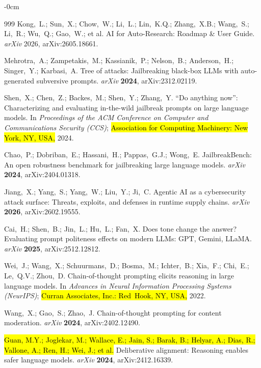 \documentclass[superintelligence,article,accept,moreauthors]{Definitions/mdpi}
\begin{document}
\begin{adjustwidth}{-\extralength}{0cm}
{\begin{thebibliography}{999}
Kong,~L.; Sun,~X.; Chow,~W.; Li,~L.; Lin,~K.Q.; Zhang,~X.B.; Wang,~S.; Li,~R.; Wu,~Q.; Gao,~W.; et al.
AI for Auto-Research: Roadmap \& User Guide.
{\em arXiv} 2026, arXiv:2605.18661.

Mehrotra,~A.; Zampetakis,~M.; Kassianik,~P.; Nelson,~B.; Anderson,~H.; Singer,~Y.; Karbasi,~A.
Tree of attacks: Jailbreaking black-box {LLMs} with auto-generated subversive prompts.
{\em arXiv} {\bf 2024}, arXiv:2312.02119.


Shen,~X.; Chen,~Z.; Backes,~M.; Shen,~Y.; Zhang,~Y.
``{D}o anything now'': Characterizing and evaluating in-the-wild jailbreak prompts on large language models.
In {\em Proceedings of the ACM Conference on Computer and Communications Security (CCS)}; \hl{Association for Computing Machinery: New York, NY, USA,} 2024.

Chao,~P.; Dobriban,~E.; Hassani,~H.; Pappas,~G.J.; Wong,~E.
{JailbreakBench}: An open robustness benchmark for jailbreaking large language models.
{\em arXiv} {\bf 2024}, arXiv:2404.01318.

Jiang,~X.; Yang,~S.; Yang,~W.; Liu,~Y.; Ji,~C.
Agentic {AI} as a cybersecurity attack surface: Threats, exploits, and defenses in runtime supply chains.
{\em arXiv} {\bf 2026}, arXiv:2602.19555.

Cai,~H.; Shen,~B.; Jin,~L.; Hu,~L.; Fan,~X.
Does tone change the answer? {E}valuating prompt politeness effects on modern {LLMs}: {GPT}, {Gemini}, {LLaMA}.
{\em arXiv} {\bf 2025}, arXiv:2512.12812.

Wei,~J.; Wang,~X.; Schuurmans,~D.; Bosma,~M.; Ichter,~B.; Xia,~F.; Chi,~E.; Le,~Q.V.; Zhou,~D.
Chain-of-thought prompting elicits reasoning in large language models.
In {\em Advances in Neural Information Processing Systems (NeurIPS)}; \hl{Curran Associates, Inc.: Red~Hook, NY, USA,} 2022.

Wang,~X.; Gao,~S.; Zhao,~J.
Chain-of-thought prompting for content moderation.
{\em arXiv} {\bf 2024}, arXiv:2402.12490.

\hl{Guan, M.Y.; Joglekar, M.; Wallace, E.; Jain, S.; Barak, B.; Helyar, A.; Dias, R.; Vallone, A.; Ren, H.; Wei, J.; et al.} %
Deliberative alignment: Reasoning enables safer language models.
{\em arXiv} {\bf 2024}, arXiv:2412.16339.


\end{thebibliography}}
\end{adjustwidth}
\end{document}
